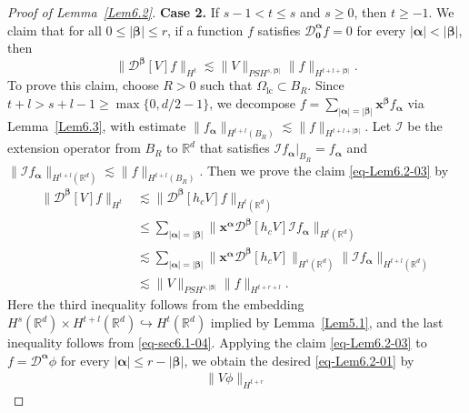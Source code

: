 \documentclass{sn-jnl}%
\newcommand{\nm}[1]{\| #1 \|}
\newcommand{\bnm}[1]{\bigl\| #1 \bigr\|}
\numberwithin{equation}{section}
\theoremstyle{thmstyleone}%
\theoremstyle{thmstyletwo}%
\theoremstyle{thmstylethree}%
\begin{document}
\begin{proof}[Proof of Lemma~\ref{Lem6.2}]
    \textbf{Case 2.} If $s-1<t\leq s$ and $s\geq 0$, then $t\geq -1 $. We claim that for all $0\leq |\bm \beta|\leq r$, if a function $f$ satisfies $\mathcal{D}_{\bm 0}^{\bm \alpha}f = 0$ for every $|\bm \alpha|< |\bm \beta|$, then
    \begin{equation}\label{eq-Lem6.2-03}
        \|\mathcal{D}^{\bm \beta}[V]f\|_{H^{t}}\lesssim \|V\|_{PSH^{s,|\bm \beta|}}\|f\|_{H^{t+l+|\bm \beta|}}.
    \end{equation}
    To prove this claim, choose $R>0$ such that $\Omega_{\mathrm{lc}}\subset B_{R}$. Since $t+l>s+l-1 \geq \max\{0,d/2-1\}$, we decompose $f = \sum_{|\bm \alpha|=|\bm \beta|}\bm x^{\bm \beta}f_{\bm \alpha}$ via Lemma~\ref{Lem6.3}, with estimate $\|f_{\bm \alpha}\|_{H^{t+l}(B_R)}\lesssim \|f\|_{H^{t+l+|\bm \beta|}}$. Let $\mathcal{I}$ be the extension operator from $B_{R}$ to $\mathbb{R}^d$ that satisfies $\mathcal{I}f_{\bm \alpha}|_{B_R}=f_{\bm \alpha}$ and $\|\mathcal{I}f_{\bm \alpha}\|_{H^{t+l}(\mathbb{R}^d)}\lesssim \|f\|_{H^{t+l}(B_R)}$. 
    Then we prove the claim \eqref{eq-Lem6.2-03} by 
    \begin{equation}\label{eq-Lem6.2-04}
    \begin{aligned}
        \bnm{\mathcal{D}^{\bm \beta}[V]f}_{H^{t}}
        &\lesssim
        \bnm{\mathcal{D}^{\bm \beta}[h_cV]f}_{H^{t}(\mathbb{R}^d)}\\
        &\leq 
        \sum_{|\bm \alpha|=|\bm \beta|}
        \bnm{\bm x^{\bm \alpha}\mathcal{D}^{\bm \beta}[h_cV]\mathcal{I}f_{\bm \alpha}}_{H^{t}(\mathbb{R}^d)}\\
        &\lesssim 
        \sum_{|\bm \alpha|=|\bm \beta|}
        \bnm{\bm x^{\bm \alpha}\mathcal{D}^{\bm \beta}[h_cV]}_{H^{s}(\mathbb{R}^d)}
        \nm{\mathcal{I}f_{\bm \alpha}}_{H^{t+l}(\mathbb{R}^d)}\\
        &\lesssim \nm{V}_{PSH^{s,|\bm \beta|}}\|f\|_{H^{t+r+l}}.
    \end{aligned}
    \end{equation}
    Here the third inequality follows from the embedding $H^{s}(\mathbb{R}^d)\times H^{t+l}(\mathbb{R}^d)\hookrightarrow H^{t}(\mathbb{R}^d)$ implied by Lemma~\ref{Lem5.1}, and the last inequality follows  from \eqref{eq-sec6.1-04}. Applying the claim \eqref{eq-Lem6.2-03} to $f = \mathcal{D}^{\bm \alpha}\phi$ for every $|\bm \alpha|\leq r-|\bm \beta|$, we obtain the desired \eqref{eq-Lem6.2-01} by
    \begin{equation}\label{eq-Lem6.2-05}
    \begin{aligned}
    \|V\phi\|_{H^{t+r}}

\end{aligned}
\end{equation}
\end{proof}
\end{document}
